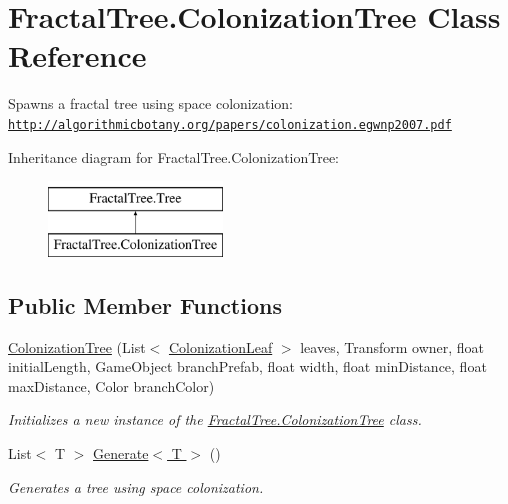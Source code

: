 \hypertarget{class_fractal_tree_1_1_colonization_tree}{}\section{Fractal\+Tree.\+Colonization\+Tree Class Reference}
\label{class_fractal_tree_1_1_colonization_tree}


Spawns a fractal tree using space colonization\+: \href{http://algorithmicbotany.org/papers/colonization.egwnp2007.pdf}{\tt http\+://algorithmicbotany.\+org/papers/colonization.\+egwnp2007.\+pdf}  


Inheritance diagram for Fractal\+Tree.\+Colonization\+Tree\+:\begin{figure}[H]
\begin{center}
\leavevmode
\includegraphics[height=2.000000cm]{class_fractal_tree_1_1_colonization_tree}
\end{center}
\end{figure}
\subsection*{Public Member Functions}
\begin{DoxyCompactItemize}
\item 
\hyperlink{class_fractal_tree_1_1_colonization_tree_a8d817a8fa8e39e3b32f69c57346978ed}{Colonization\+Tree} (List$<$ \hyperlink{class_fractal_tree_1_1_colonization_leaf}{Colonization\+Leaf} $>$ leaves, Transform owner, float initial\+Length, Game\+Object branch\+Prefab, float width, float min\+Distance, float max\+Distance, Color branch\+Color)
\begin{DoxyCompactList}\small\item\em Initializes a new instance of the \hyperlink{class_fractal_tree_1_1_colonization_tree}{Fractal\+Tree.\+Colonization\+Tree} class. \end{DoxyCompactList}\item 
List$<$ T $>$ \hyperlink{class_fractal_tree_1_1_colonization_tree_ac16d379a8d3c2f2a56ef5e3f1c66df36}{Generate$<$ T $>$} ()
\begin{DoxyCompactList}\small\item\em Generates a tree using space colonization. \end{DoxyCompactList}\end{DoxyCompactItemize}


